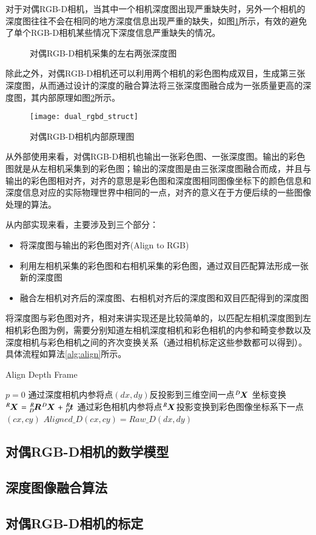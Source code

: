 对于对偶RGB-D相机，当其中一个相机深度图出现严重缺失时，另外一个相机的深度图往往不会在相同的地方深度信息出现严重的缺失，如图\ref{fig:dual_rgbd_depth}所示，有效的避免了单个RGB-D相机某些情况下深度信息严重缺失的情况。
\begin{figure}[!ht]
  \centering
  \hfill
  \caption{对偶RGB-D相机采集的左右两张深度图}
  \label{fig:dual_rgbd_depth}
\end{figure}

除此之外，对偶RGB-D相机还可以利用两个相机的彩色图构成双目，生成第三张深度图，从而通过设计的深度的融合算法将三张深度图融合成为一张质量更高的深度图，其内部原理如图\ref{fig:dual_rgbd_struct}所示。
\begin{figure}[!ht]
  \centering
  \texttt{[image: dual\_rgbd\_struct]}
  \caption{对偶RGB-D相机内部原理图}
  \label{fig:dual_rgbd_struct}
\end{figure}

从外部使用来看，对偶RGB-D相机也输出一张彩色图、一张深度图。输出的彩色图就是从左相机采集到的彩色图；输出的深度图是由三张深度图融合而成，并且与输出的彩色图相对齐，对齐的意思是彩色图和深度图相同图像坐标下的颜色信息和深度信息对应的实际物理世界中相同的一点，对齐的意义在于方便后续的一些图像处理的算法。

从内部实现来看，主要涉及到三个部分：
\begin{itemize}
\item 将深度图与输出的彩色图对齐(Align to RGB)
\item 利用左相机采集的彩色图和右相机采集的彩色图，通过双目匹配算法形成一张新的深度图
\item 融合左相机对齐后的深度图、右相机对齐后的深度图和双目匹配得到的深度图
\end{itemize}
将深度图与彩色图对齐，相对来讲实现还是比较简单的，以匹配左相机深度图到左相机彩色图为例，需要分别知道左相机深度相机和彩色相机的内参和畸变参数以及深度相机与彩色相机之间的齐次变换关系（通过相机标定这些参数都可以得到）。具体流程如算法\ref{alg:align}所示。
\begin{algorithm}[!ht]
  \caption{Align Depth Frame}
  \label{alg:align}
   {
    $p = 0$
  }
   {
     {
      通过深度相机内参将点$(dx, dy)$反投影到三维空间一点$\tensor*[^D]{\bm{X}}{}$\;
      坐标变换$\tensor*[^R]{\bm{X}}{} = \tensor*[^R_D]{\bm{R}}{}\tensor*[^D]{\bm{X}}{} + \tensor*[^R_D]{\bm{t}}{}$\;
      通过彩色相机内参将点$\tensor*[^R]{\bm{X}}{}$投影变换到彩色图像坐标系下一点$(cx, cy)$\;
      \If {cx in $(0, cw]$ and cy in $(0, ch]$} {
        $Aligned\_D(cx, cy) = Raw\_D(dx, dy)$\;
      }
    }
  }
\end{algorithm}


\subsection{对偶RGB-D相机的数学模型}
\subsection{深度图像融合算法}

\subsection{对偶RGB-D相机的标定}